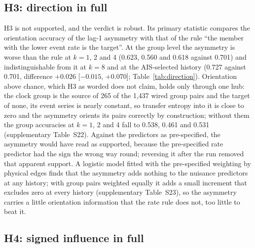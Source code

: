 \subsection{H3: direction in full}
\label{sec:r1-h3-full}

H3 is not supported, and the verdict is robust. Its primary statistic compares the orientation accuracy of the lag-1 asymmetry with that of the rule ``the member with the lower event rate is the target''. At the group level the asymmetry is worse than the rule at $k = 1$, 2 and 4 (0.623, 0.560 and 0.618 against 0.701) and indistinguishable from it at $k = 8$ and at the AIS-selected history (0.727 against 0.701, difference $+0.026$ [$-0.015$, $+0.070$]; Table~\ref{tab:direction}). Orientation above chance, which H3 as worded does not claim, holds only through one hub: the clock group is the source of 265 of the 1,437 wired group pairs and the target of none, its event series is nearly constant, so transfer entropy into it is close to zero and the asymmetry orients its pairs correctly by construction; without them the group accuracies at $k = 1$, 2 and 4 fall to 0.538, 0.461 and 0.531 (supplementary Table~S22). Against the predictors as pre-specified, the asymmetry would have read as supported, because the pre-specified rate predictor had the sign the wrong way round; reversing it after the run removed that apparent support. A logistic model fitted with the pre-specified weighting by physical edges finds that the asymmetry adds nothing to the nuisance predictors at any history; with group pairs weighted equally it adds a small increment that excludes zero at every history (supplementary Table~S23), so the asymmetry carries a little orientation information that the rate rule does not, too little to beat it.



\subsection{H4: signed influence in full}
\label{sec:r1-h4-full}

